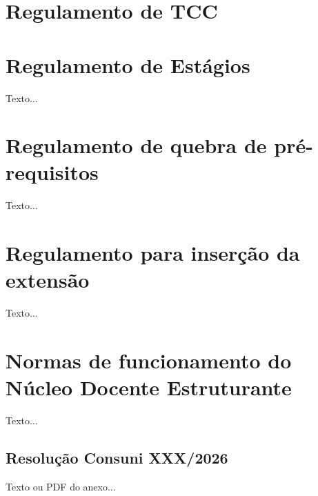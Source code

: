 
\begin{apendicesenv}
\partapendices %

\chapter{Regulamento de TCC}
\label{apendice:tcc}

\chapter{Regulamento de Estágios}
\label{apendice:estagios}
Texto...

\chapter{Regulamento de quebra de pré-requisitos}
\label{apendice:prereq}
Texto...

\chapter{Regulamento para inserção da extensão}
\label{apendice:extensao}
Texto...

\chapter{Normas de funcionamento do Núcleo Docente Estruturante}
\label{apendice:nde}
Texto...

\end{apendicesenv}

\begin{anexosenv}
\partanexos %

\chapter{Resolução Consuni XXX/2026}
\label{anexo:resolucao}
Texto ou PDF do anexo...

\end{anexosenv}